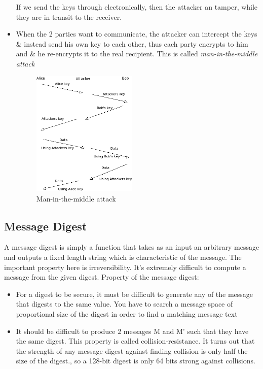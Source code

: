 \documentclass[a4paper]{article}
\begin{document}
\begin{itemize}
        If we send the keys through electronically, then the attacker an tamper, while they are in transit to the receiver.
    \item When the 2 parties want to communicate, the attacker can intercept the keys \& instead send his own key to each other, 
        thus each party encrypts to him and \& he re-encrypts it to the real recipient. 
        This is called \textit{man-in-the-middle attack}
        \begin{figure}[ht!]
            \centering
            \includegraphics[width=50mm]{mitm.png}
            \caption{Man-in-the-middle attack}
        \end{figure}
\end{itemize}
\subsection{Message Digest}
A message digest is simply a function that takes as an input an arbitrary message and outputs a fixed length string 
which is characteristic of the message. The important property here is irreversibility.  
It's extremely difficult to compute a message from the given digest. 
Property of the message digest: 
\begin{itemize}
    \item For a digest to be secure, it must be difficult to generate any of the message that digests to the same value. 
        You have to search a message space of proportional size of the digest in order to find a matching message text
    \item It should be difficult to produce 2 messages M and M' such that they have the same digest. 
        This property is called collision-resistance. It turns out that the strength of any message digest 
        against finding collision is only half the size of the digest., so a 128-bit digest is only 64 bits strong against collisions.
\end{itemize}
\end{document}
